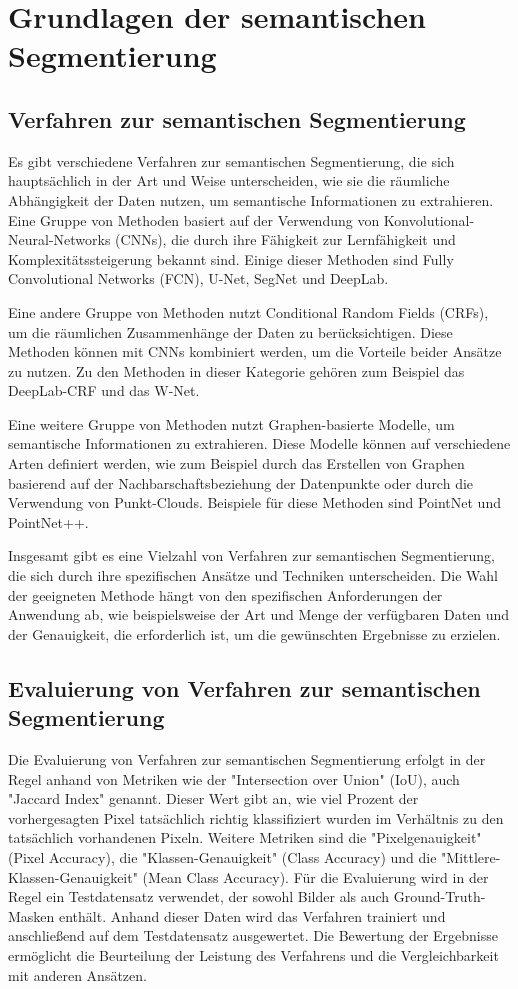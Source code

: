 \chapter{Grundlagen der semantischen Segmentierung}

\section{Verfahren zur semantischen Segmentierung}
Es gibt verschiedene Verfahren zur semantischen Segmentierung, die sich
hauptsächlich in der Art und Weise unterscheiden, wie sie die räumliche
Abhängigkeit der Daten nutzen, um semantische Informationen zu extrahieren.
Eine Gruppe von Methoden basiert auf der Verwendung von
Konvolutional-Neural-Networks (CNNs), die durch ihre Fähigkeit zur
Lernfähigkeit und Komplexitätssteigerung bekannt sind. Einige dieser Methoden
sind Fully Convolutional Networks (FCN), U-Net, SegNet und DeepLab.

Eine andere Gruppe von Methoden nutzt Conditional Random Fields (CRFs), um die
räumlichen Zusammenhänge der Daten zu berücksichtigen. Diese Methoden können
mit CNNs kombiniert werden, um die Vorteile beider Ansätze zu nutzen. Zu den
Methoden in dieser Kategorie gehören zum Beispiel das DeepLab-CRF und das
W-Net.

Eine weitere Gruppe von Methoden nutzt Graphen-basierte Modelle, um semantische
Informationen zu extrahieren. Diese Modelle können auf verschiedene Arten
definiert werden, wie zum Beispiel durch das Erstellen von Graphen basierend
auf der Nachbarschaftsbeziehung der Datenpunkte oder durch die Verwendung von
Punkt-Clouds. Beispiele für diese Methoden sind PointNet und PointNet++.

Insgesamt gibt es eine Vielzahl von Verfahren zur semantischen Segmentierung,
die sich durch ihre spezifischen Ansätze und Techniken unterscheiden. Die Wahl
der geeigneten Methode hängt von den spezifischen Anforderungen der Anwendung
ab, wie beispielsweise der Art und Menge der verfügbaren Daten und der
Genauigkeit, die erforderlich ist, um die gewünschten Ergebnisse zu erzielen.
\section{Evaluierung von Verfahren zur semantischen Segmentierung}
Die Evaluierung von Verfahren zur semantischen Segmentierung erfolgt in der
Regel anhand von Metriken wie der "Intersection over Union" (IoU), auch
"Jaccard Index" genannt. Dieser Wert gibt an, wie viel Prozent der
vorhergesagten Pixel tatsächlich richtig klassifiziert wurden im Verhältnis zu
den tatsächlich vorhandenen Pixeln. Weitere Metriken sind die
"Pixelgenauigkeit" (Pixel Accuracy), die "Klassen-Genauigkeit" (Class Accuracy)
und die "Mittlere-Klassen-Genauigkeit" (Mean Class Accuracy). Für die
Evaluierung wird in der Regel ein Testdatensatz verwendet, der sowohl Bilder
als auch Ground-Truth-Masken enthält. Anhand dieser Daten wird das Verfahren
trainiert und anschließend auf dem Testdatensatz ausgewertet. Die Bewertung der
Ergebnisse ermöglicht die Beurteilung der Leistung des Verfahrens und die
Vergleichbarkeit mit anderen Ansätzen.
